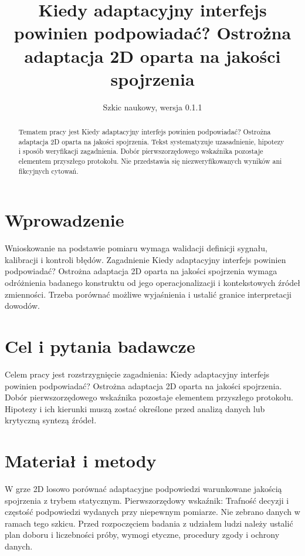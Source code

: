 \documentclass[11pt,a4paper]{article}
\title{Kiedy adaptacyjny interfejs powinien podpowiadać? Ostrożna adaptacja 2D oparta na jakości spojrzenia}
\author{}
\date{Szkic naukowy, wersja 0.1.1}
\begin{document}
\maketitle

\begin{abstract}

Tematem pracy jest Kiedy adaptacyjny interfejs powinien podpowiadać? Ostrożna adaptacja 2D oparta na jakości spojrzenia. Tekst systematyzuje uzasadnienie, hipotezy i sposób weryfikacji zagadnienia. Dobór pierwszorzędowego wskaźnika pozostaje elementem przyszłego protokołu. Nie przedstawia się niezweryfikowanych wyników ani fikcyjnych cytowań.

\end{abstract}

\section{Wprowadzenie}

Wnioskowanie na podstawie pomiaru wymaga walidacji definicji sygnału, kalibracji i kontroli błędów. Zagadnienie Kiedy adaptacyjny interfejs powinien podpowiadać? Ostrożna adaptacja 2D oparta na jakości spojrzenia wymaga odróżnienia badanego konstruktu od jego operacjonalizacji i kontekstowych źródeł zmienności. Trzeba porównać możliwe wyjaśnienia i ustalić granice interpretacji dowodów.

\section{Cel i pytania badawcze}

Celem pracy jest rozstrzygnięcie zagadnienia: Kiedy adaptacyjny interfejs powinien podpowiadać? Ostrożna adaptacja 2D oparta na jakości spojrzenia. Dobór pierwszorzędowego wskaźnika pozostaje elementem przyszłego protokołu. Hipotezy i ich kierunki muszą zostać określone przed analizą danych lub krytyczną syntezą źródeł.

\section{Materiał i metody}

W grze 2D losowo porównać adaptacyjne podpowiedzi warunkowane jakością spojrzenia z trybem statycznym. Pierwszorzędowy wskaźnik: Trafność decyzji i częstość podpowiedzi wydanych przy niepewnym pomiarze. Nie zebrano danych w ramach tego szkicu. Przed rozpoczęciem badania z udziałem ludzi należy ustalić plan doboru i liczebności próby, wymogi etyczne, procedury zgody i ochrony danych.
\end{document}
